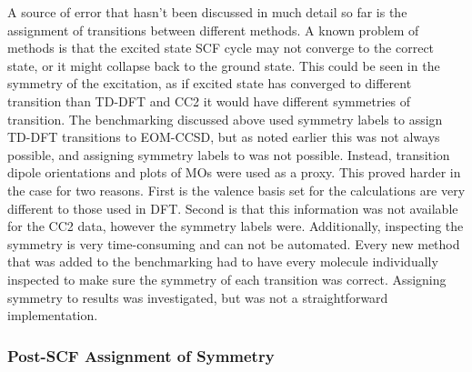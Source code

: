 A source of error that hasn't been discussed in much detail so far is
the assignment of transitions between different methods. A known problem of \dscf
methods is that the excited state SCF cycle may not converge to the correct state,
or it might collapse back to the ground state. This could be seen in the symmetry
of the excitation, as if \dscf excited state has converged to different transition
than TD-DFT and CC2 it would have different symmetries of transition. The benchmarking discussed
above used symmetry labels to assign TD-DFT transitions to EOM-CCSD, but as noted
earlier this was not always possible, and assigning symmetry labels to \dscf was 
not possible. Instead, transition dipole orientations and plots of MOs were used
as a proxy. This proved harder in the \dxtb case for two reasons. First is the
valence basis set for the \dxtb calculations are very different to those used in
DFT. Second is that this information was not available for the CC2 data, however
the symmetry labels were. Additionally, inspecting the symmetry is very time-consuming
and can not be automated. Every new method that was added to the benchmarking
had to have every molecule individually inspected to make sure the symmetry
of each transition was correct. Assigning symmetry to \dscf results was investigated,
but was not a straightforward implementation.
 
\subsubsection{Post-SCF Assignment of Symmetry}
\label{subsubsec:post_scf_symmetry}


